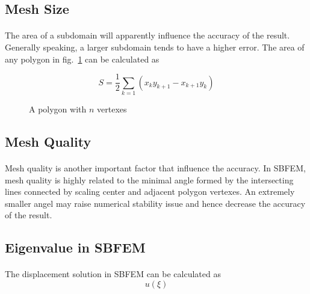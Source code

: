 
\subsection{Mesh Size}
\paragraph{}
The area of a subdomain will apparently influence the accuracy of the result.
Generally speaking, a larger subdomain tends to have a higher error.
The area of any polygon in fig.~\ref{adap_ei_polygon} can be calculated as 

\begin{equation}
    S = \frac{1}{2}
        \sum_{k=1}
        \left(
            x_k y_{k+1} - x_{k+1} y_k
        \right)
\end{equation}

\begin{figure}[!ht]
    \centering
    \caption{A polygon with $n$ vertexes}
    \label{adap_ei_polygon}
\end{figure}

\subsection{Mesh Quality}
\paragraph{}
Mesh quality is another important factor that influence the accuracy.
In SBFEM, mesh quality is highly related to the minimal angle formed by the intersecting lines connected by scaling center and adjacent polygon vertexes.
An extremely smaller angel may raise numerical stability issue and hence decrease the accuracy of the result.



\subsection{Eigenvalue in SBFEM}
\paragraph{}
The displacement solution in SBFEM can be calculated as
\begin{equation}
    u(\xi)
\end{equation}


